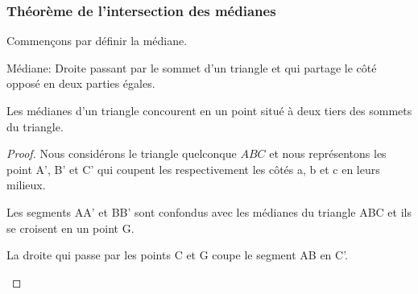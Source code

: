 \documentclass[a4paper,12pt]{article}
\begin{document}
\pagebreak
\subsubsection{Théorème de l'intersection des médianes}
Commençons par définir la médiane.
\begin{definition}{Médiane:}
Droite passant par le sommet d'un triangle et qui partage le côté opposé en deux parties égales.
\end{definition}

\begin{theorem}
Les médianes d'un triangle concourent en un point situé à deux tiers des sommets du triangle.
\end{theorem}

\begin{proof}
Nous considérons le triangle quelconque $ABC$ et nous représentons les point A', B' et C' qui coupent les respectivement les côtés a, b et c en leurs milieux. 
\begin{hyp}
Les segments AA' et BB' sont confondus avec les médianes du triangle ABC et ils se croisent en un point G.
\end{hyp}
\begin{concl}
La droite qui passe par les points C et G coupe le segment AB en C'.
\end{concl}

\end{proof}
\end{document}
